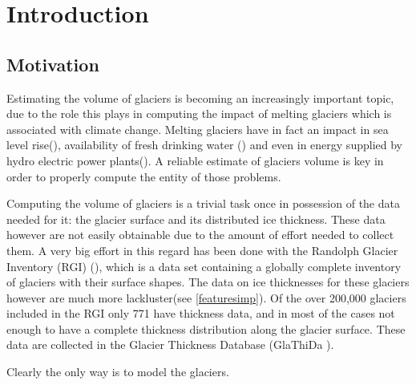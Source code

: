 \chapter{Introduction}\label{chap1}
\thispagestyle{plain}

\section{Motivation}\label{motivation}
Estimating the volume of glaciers is becoming an increasingly important topic, due to the role this plays in computing the impact of melting glaciers which is associated with climate change. Melting glaciers have in fact an impact in sea level rise(\citet{Zemp2017}), availability of fresh drinking water (\citet{Kaser2010}) and even in energy supplied by hydro electric power plants(\citet{Terrier2011}). A reliable estimate of glaciers volume is key in order to properly compute the entity of those problems.

Computing the volume of glaciers is a trivial task once in possession of the data needed for it: the glacier surface and its distributed ice thickness. These data however are not easily obtainable due to the amount of effort needed to collect them. A very big effort in this regard has been done with the Randolph Glacier Inventory (RGI) (\citet{RGI2014}), which is a data set containing a globally complete inventory of glaciers with their surface shapes. The data on ice thicknesses for these glaciers however are much more lackluster(see \ref{featuresimp}). Of the over 200,000 glaciers included in the RGI only 771 have thickness data, and in most of the cases not enough to have a complete thickness distribution along the glacier surface. These data are collected in the Glacier Thickness Database (GlaThiDa \citet{GlaThiDa2014}).

Clearly the only way is to model the glaciers.
  

